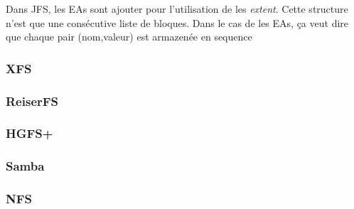 Dans JFS, les EAs sont ajouter pour l'utilisation de les \emph{extent}. Cette structure n'est que une consécutive liste de bloques. Dans le cas de les EAs, ça veut dire que chaque pair (nom,valeur) est armazenée en sequence


\subsubsection*{XFS}

\subsubsection*{ReiserFS}
\subsubsection*{HGFS+}
\subsubsection*{Samba}
\subsubsection*{NFS}

